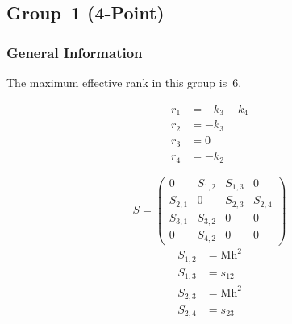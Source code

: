 \documentclass[a4paper]{article}
\begin{document}

\subsection{Group~1 (4-Point)}
\subsubsection*{General Information}
The maximum effective rank in this group is~6.

\begin{subequations}
\begin{align}
r_{1} &= -k_{3}-k_{4}\\
r_{2} &= -k_{3}\\
r_{3} &= 0\\
r_{4} &= -k_{2}
\end{align}
\end{subequations}

\begin{equation}
S=\left(\begin{array}{cccc}
   0&
   S_{1,2}&
   S_{1,3}&
   0\\
   S_{2,1}&
   0&
   S_{2,3}&
   S_{2,4}\\
   S_{3,1}&
   S_{3,2}&
   0&
   0\\
   0&
   S_{4,2}&
   0&
   0\end{array}\right)
\end{equation}
\begin{subequations}
\begin{align}
   S_{1,2}&=\text{Mh}^2\\
   S_{1,3}&=s_{12}\\
   S_{2,3}&=\text{Mh}^2\\
   S_{2,4}&=s_{23}
\end{align}
\end{subequations}
\end{document}
